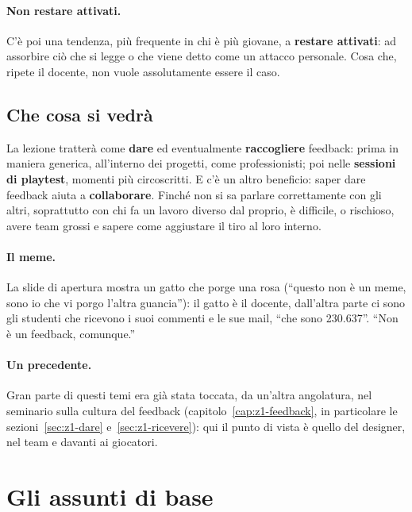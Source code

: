 \paragraph{Non restare attivati.} C'è poi una tendenza, più frequente in
chi è più giovane, a \textbf{restare attivati}: ad assorbire ciò che si
legge o che viene detto come un attacco personale. Cosa che, ripete il
docente, non vuole assolutamente essere il caso.

\subsection{Che cosa si vedrà}

La lezione tratterà come \textbf{dare} ed eventualmente \textbf{raccogliere}
feedback: prima in maniera generica, all'interno dei progetti, come
professionisti; poi nelle \textbf{sessioni di playtest}, momenti più
circoscritti. E c'è un altro beneficio: saper dare feedback aiuta a
\textbf{collaborare}. Finché non si sa parlare correttamente con gli altri,
soprattutto con chi fa un lavoro diverso dal proprio, è difficile, o
rischioso, avere team grossi e sapere come aggiustare il tiro al loro
interno.

\paragraph{Il meme.} La slide di apertura mostra un gatto che porge una rosa
(``questo non è un meme, sono io che vi porgo l'altra guancia''): il gatto è
il docente, dall'altra parte ci sono gli studenti che ricevono i suoi
commenti e le sue mail, ``che sono 230.637''. ``Non è un feedback,
comunque.''

\paragraph{Un precedente.} Gran parte di questi temi era già stata toccata,
da un'altra angolatura, nel seminario sulla cultura del feedback
(capitolo~\ref{cap:z1-feedback}, in particolare le
sezioni~\ref{sec:z1-dare} e~\ref{sec:z1-ricevere}): qui il punto di vista è
quello del designer, nel team e davanti ai giocatori.

\section{Gli assunti di base}
\label{gd10:sec:assunti}

